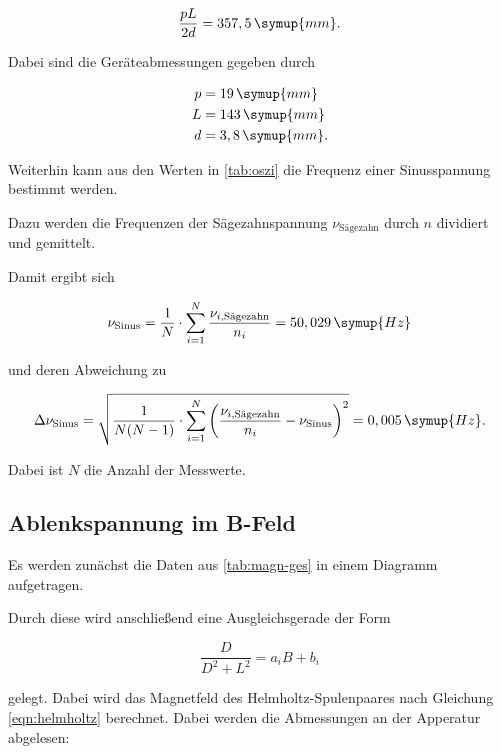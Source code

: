 \begin{equation}
  \frac{p L}{2 d} = 357,5 \, \symup{mm}.
\end{equation}

Dabei sind die Geräteabmessungen gegeben durch

\begin{align*}
  p &= 19  \, \symup{mm} \\
  L &= 143 \, \symup{mm} \\
  d &= 3,8 \, \symup{mm}.
\end{align*}

Weiterhin kann aus den Werten in \autoref{tab:oszi} die Frequenz einer Sinusspannung bestimmt werden.



Dazu werden die Frequenzen der Sägezahnspannung $\nu_\text{Sägezahn}$ durch $n$ dividiert und gemittelt.

Damit ergibt sich 

\begin{equation}
  \nu_\text{Sinus} = \frac{1}{N} \cdot \sum_{i=1}^{N} \frac{\nu_{i, \text{Sägezahn}} }{n_i} = 50,029 \, \symup{Hz}
\end{equation}

und deren Abweichung zu 

\begin{equation}
  \Delta \nu_\text{Sinus} = \sqrt{ \frac{1}{N(N-1)} \cdot \sum_{i=1}^{N} \bigg( \frac{\nu_{i, \text{Sägezahn}}}{n_i} - \nu_\text{Sinus} \bigg)^2 } = 0,005 \, \symup{Hz}.
\end{equation}

Dabei ist $N$ die Anzahl der Messwerte.

\subsection{Ablenkspannung im B-Feld}

Es werden zunächst die Daten aus \autoref{tab:magn-ges} in einem Diagramm aufgetragen.



Durch diese wird anschließend eine Ausgleichsgerade der Form

\begin{equation}
  \frac{D}{D^2 + L^2} = a_i B + b_i
\end{equation}

gelegt. Dabei wird das Magnetfeld des Helmholtz-Spulenpaares nach Gleichung \eqref{eqn:helmholtz} berechnet.
Dabei werden die Abmessungen an der Apperatur abgelesen:

